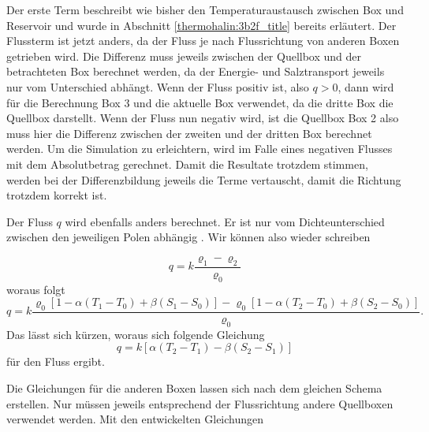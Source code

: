 Der erste Term beschreibt wie bisher den Temperaturaustausch zwischen Box und Reservoir und wurde in  Abschnitt \ref{thermohalin:3b2f_title} bereits erläutert. Der Flussterm ist jetzt anders, da der Fluss je nach Flussrichtung von anderen Boxen getrieben wird. Die Differenz muss jeweils zwischen der Quellbox und der betrachteten Box berechnet werden, da der Energie- und Salztransport jeweils nur vom Unterschied abhängt.
Wenn der Fluss positiv ist, also $q>0$, dann wird für die Berechnung Box 3 und die aktuelle Box verwendet, da die dritte Box die Quellbox darstellt. Wenn der Fluss nun negativ wird, ist die Quellbox Box 2 also muss hier die Differenz zwischen der zweiten und der dritten Box berechnet werden. Um die Simulation zu erleichtern, wird im Falle eines negativen Flusses mit dem Absolutbetrag gerechnet. Damit die Resultate trotzdem stimmen, werden bei der Differenzbildung jeweils die Terme vertauscht, damit die Richtung trotzdem korrekt ist. 

Der Fluss $q$ wird ebenfalls anders berechnet. Er ist nur vom Dichteunterschied zwischen den jeweiligen Polen abhängig \cite{skript:kaperengler}.
Wir können also wieder schreiben

\begin{equation}
q = k\frac{\varrho_1-\varrho_2}{\varrho_0}
\end{equation}
woraus folgt
\begin{equation}
q= k\frac{\varrho_0[1-\alpha(T_1-T_0)+\beta(S_1-S_0)]-\varrho_0[1-\alpha(T_2-T_0)+\beta(S_2-S_0)]}{\varrho_0}.
\end{equation}
Das lässt sich kürzen, woraus sich folgende Gleichung
\begin{equation}
q = k[\alpha(T_2-T_1)-\beta(S_2-S_1)] 
\end{equation}
für den Fluss ergibt.


Die Gleichungen für die anderen Boxen lassen sich nach dem gleichen Schema erstellen. Nur müssen jeweils entsprechend der Flussrichtung andere Quellboxen verwendet werden. Mit den entwickelten Gleichungen 


